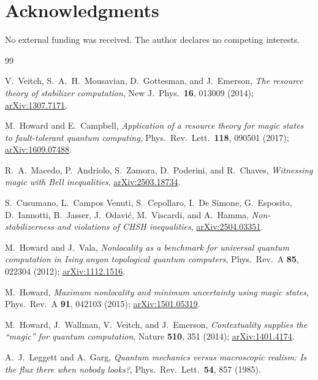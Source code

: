 \documentclass[aps,pra,twocolumn,superscriptaddress,longbibliography,floatfix,nofootinbib]{revtex4-2}
\begin{document}
\section*{Acknowledgments}
No external funding was received. The author declares no competing
interests.

\begin{thebibliography}{99}

V.~Veitch, S.~A.~H.~Mousavian, D.~Gottesman, and J.~Emerson,
\emph{The resource theory of stabilizer computation},
New J.\ Phys.\ \textbf{16}, 013009 (2014);
\href{https://arxiv.org/abs/1307.7171}{arXiv:1307.7171}.

M.~Howard and E.~Campbell,
\emph{Application of a resource theory for magic states to
fault-tolerant quantum computing},
Phys.\ Rev.\ Lett.\ \textbf{118}, 090501 (2017);
\href{https://arxiv.org/abs/1609.07488}{arXiv:1609.07488}.

R.~A.~Macedo, P.~Andriolo, S.~Zamora, D.~Poderini, and R.~Chaves,
\emph{Witnessing magic with Bell inequalities},
\href{https://arxiv.org/abs/2503.18734}{arXiv:2503.18734}.

S.~Cusumano, L.~Campos Venuti, S.~Cepollaro, I.~De Simone, G.~Esposito,
D.~Iannotti, B.~Jasser, J.~Odavi\'c, M.~Viscardi, and A.~Hamma,
\emph{Non-stabilizerness and violations of CHSH inequalities},
\href{https://arxiv.org/abs/2504.03351}{arXiv:2504.03351}.

M.~Howard and J.~Vala,
\emph{Nonlocality as a benchmark for universal quantum computation in
Ising anyon topological quantum computers},
Phys.\ Rev.\ A \textbf{85}, 022304 (2012);
\href{https://arxiv.org/abs/1112.1516}{arXiv:1112.1516}.

M.~Howard,
\emph{Maximum nonlocality and minimum uncertainty using magic states},
Phys.\ Rev.\ A \textbf{91}, 042103 (2015);
\href{https://arxiv.org/abs/1501.05319}{arXiv:1501.05319}.

M.~Howard, J.~Wallman, V.~Veitch, and J.~Emerson,
\emph{Contextuality supplies the ``magic'' for quantum computation},
Nature \textbf{510}, 351 (2014);
\href{https://arxiv.org/abs/1401.4174}{arXiv:1401.4174}.

A.~J.~Leggett and A.~Garg,
\emph{Quantum mechanics versus macroscopic realism: Is the flux there
when nobody looks?},
Phys.\ Rev.\ Lett.\ \textbf{54}, 857 (1985).


\end{thebibliography}
\end{document}
